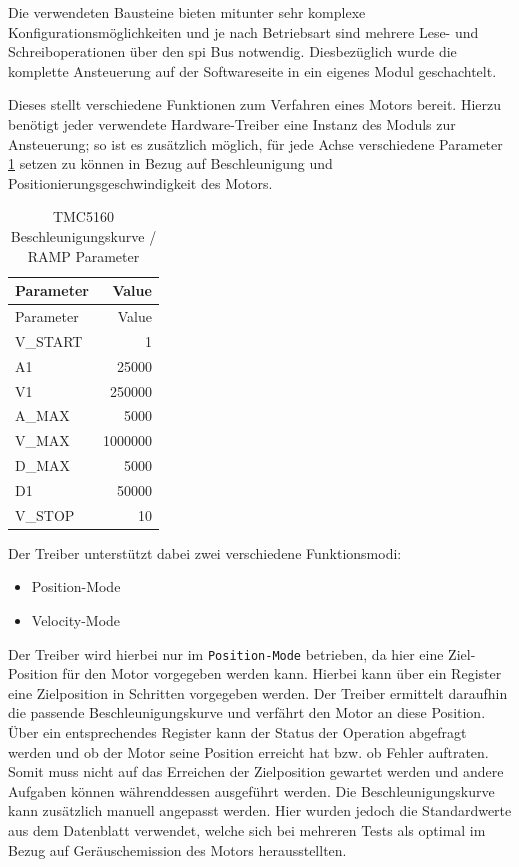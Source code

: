 Die verwendeten Bausteine bieten mitunter sehr komplexe
Konfigurationsmöglichkeiten und je nach Betriebsart sind mehrere Lese-
und Schreiboperationen über den \gls{spi} Bus notwendig. Diesbezüglich
wurde die komplette Ansteuerung auf der Softwareseite in ein eigenes
Modul geschachtelt.

Dieses stellt verschiedene Funktionen zum Verfahren eines Motors bereit.
Hierzu benötigt jeder verwendete Hardware-Treiber eine Instanz des
Moduls zur Ansteuerung; so ist es zusätzlich möglich, für jede Achse
verschiedene Parameter \ref{tmcrampparams} setzen zu können in Bezug auf
Beschleunigung und Positionierungsgeschwindigkeit des Motors.

\begin{longtable}[]{@{}lr@{}}
\caption{TMC5160 Beschleunigungskurve / RAMP Parameter
\label{tmcrampparams}}\tabularnewline
\toprule
Parameter & Value\tabularnewline
\midrule
\endfirsthead
\toprule
Parameter & Value\tabularnewline
\midrule
\endhead
V\_START & 1\tabularnewline
A1 & 25000\tabularnewline
V1 & 250000\tabularnewline
A\_MAX & 5000\tabularnewline
V\_MAX & 1000000\tabularnewline
D\_MAX & 5000\tabularnewline
D1 & 50000\tabularnewline
V\_STOP & 10\tabularnewline
\bottomrule
\end{longtable}

Der Treiber unterstützt dabei zwei verschiedene Funktionsmodi:

\begin{itemize}
\tightlist
\item
  Position-Mode
\item
  Velocity-Mode
\end{itemize}

Der Treiber wird hierbei nur im \passthrough{\lstinline!Position-Mode!}
betrieben, da hier eine Ziel-Position für den Motor vorgegeben werden
kann. Hierbei kann über ein Register eine Zielposition in Schritten
vorgegeben werden. Der Treiber ermittelt daraufhin die passende
Beschleunigungskurve und verfährt den Motor an diese Position. Über ein
entsprechendes Register kann der Status der Operation abgefragt werden
und ob der Motor seine Position erreicht hat bzw. ob Fehler auftraten.
Somit muss nicht auf das Erreichen der Zielposition gewartet werden und
andere Aufgaben können währenddessen ausgeführt werden. Die
Beschleunigungskurve kann zusätzlich manuell angepasst werden. Hier
wurden jedoch die Standardwerte aus dem Datenblatt verwendet, welche
sich bei mehreren Tests als optimal im Bezug auf Geräuschemission des
Motors herausstellten.

